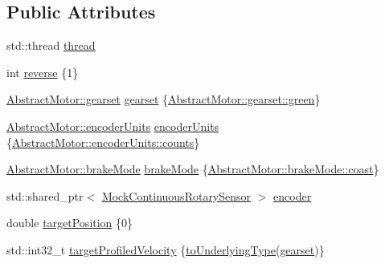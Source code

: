 \subsection*{Public Attributes}
\begin{DoxyCompactItemize}
\item 
std\+::thread \mbox{\hyperlink{classokapi_1_1ThreadedMockMotor_a054b3f6bef90470907050cd5c90f4eea}{thread}}
\item 
int \mbox{\hyperlink{classokapi_1_1ThreadedMockMotor_ac72037473d0f939b338f04e3f0fe140d}{reverse}} \{1\}
\item 
\mbox{\hyperlink{classokapi_1_1AbstractMotor_a88aaa6ea2fa10f5520a537bbf26774d5}{Abstract\+Motor\+::gearset}} \mbox{\hyperlink{classokapi_1_1ThreadedMockMotor_a5ec76a7a3008f4d0c9ab1c21507f6fc9}{gearset}} \{\mbox{\hyperlink{classokapi_1_1AbstractMotor_a88aaa6ea2fa10f5520a537bbf26774d5a9f27410725ab8cc8854a2769c7a516b8}{Abstract\+Motor\+::gearset\+::green}}\}
\item 
\mbox{\hyperlink{classokapi_1_1AbstractMotor_ae811cd825099f2defadeb1b7f7e7764c}{Abstract\+Motor\+::encoder\+Units}} \mbox{\hyperlink{classokapi_1_1ThreadedMockMotor_a2a45cff92bbb1fdad09c65107ef3fb4f}{encoder\+Units}} \{\mbox{\hyperlink{classokapi_1_1AbstractMotor_ae811cd825099f2defadeb1b7f7e7764ca0700cd3e2cd8b37ef510dd5aa2c81fc6}{Abstract\+Motor\+::encoder\+Units\+::counts}}\}
\item 
\mbox{\hyperlink{classokapi_1_1AbstractMotor_a132e0485dbb59a60c3f934338d8fa601}{Abstract\+Motor\+::brake\+Mode}} \mbox{\hyperlink{classokapi_1_1ThreadedMockMotor_a6cdc3db5704767c8619924556625a090}{brake\+Mode}} \{\mbox{\hyperlink{classokapi_1_1AbstractMotor_a132e0485dbb59a60c3f934338d8fa601a756d153ba898e1be8218d4651009e981}{Abstract\+Motor\+::brake\+Mode\+::coast}}\}
\item 
std\+::shared\+\_\+ptr$<$ \mbox{\hyperlink{classokapi_1_1MockContinuousRotarySensor}{Mock\+Continuous\+Rotary\+Sensor}} $>$ \mbox{\hyperlink{classokapi_1_1ThreadedMockMotor_ac4cb124dd63985b8a7616fa07c181e1e}{encoder}}
\item 
double \mbox{\hyperlink{classokapi_1_1ThreadedMockMotor_affa1069c6e9acdb02bd035ec1c3f91b4}{target\+Position}} \{0\}
\item 
std\+::int32\+\_\+t \mbox{\hyperlink{classokapi_1_1ThreadedMockMotor_a8e3fbff87a0da7c24f74b649ad709827}{target\+Profiled\+Velocity}} \{\mbox{\hyperlink{namespaceokapi_a458b2538f443eedc4e601b2f8a9acf03}{to\+Underlying\+Type}}(\mbox{\hyperlink{classokapi_1_1AbstractMotor_a88aaa6ea2fa10f5520a537bbf26774d5}{gearset}})\}

\end{DoxyCompactItemize}

